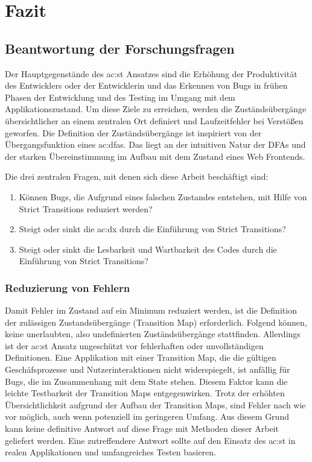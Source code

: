 \chapter{Fazit} \label{ch:fazit}

\section{Beantwortung der Forschungsfragen}

Der Hauptgegenstände des \acrlong{ac:st} Ansatzes sind die Erhöhung der Produktivität des Entwicklers oder der Entwicklerin und das Erkennen von Bugs in frühen Phasen der Entwicklung und des Testing im Umgang mit dem Applikationszustand. Um diese Ziele zu erreichen, werden die Zuständsübergänge übersichtlicher an einem zentralen Ort definiert und Laufzeitfehler bei Verstößen geworfen. Die Definition der Zuständsübergänge ist inspiriert von der Übergangsfunktion eines \acrshort{ac:dfa}s. Das liegt an der intuitiven Natur der DFAs und der starken Übereinstimmung im Aufbau mit dem Zustand eines Web Frontends.

Die drei zentralen Fragen, mit denen sich diese Arbeit beschäftigt sind:

\begin{enumerate}
  \item Können Bugs, die Aufgrund eines falschen Zustandes entstehen, mit Hilfe von Strict Transitions reduziert werden?
  \item Steigt oder sinkt die \acrshort{ac:dx} durch die Einführung von Strict Transitions?
  \item Steigt oder sinkt die Lesbarkeit und Wartbarkeit des Codes durch die Einführung von Strict Transitions?
\end{enumerate}

\subsection{Reduzierung von Fehlern}

Damit Fehler im Zustand auf ein Minimum reduziert werden, ist die Definition der zulässigen Zustandsübergänge (Transition Map) erforderlich. Folgend können, keine unerlaubten, also undefinierten Zuständsübergänge stattfinden. Allerdings ist der \acrshort{ac:st} Ansatz ungeschützt vor fehlerhaften oder unvollständigen Definitionen. Eine Applikation mit einer Transition Map, die die gültigen Geschäfsprozesse und Nutzerinteraktionen nicht widerspiegelt, ist anfällig für Bugs, die im Zusammenhang mit dem State stehen. Diesem Faktor kann die leichte Testbarkeit der Transition Maps entgegenwirken. Trotz der erhöhten Übersichtlichkeit aufgrund der Aufbau der Transition Maps, sind Fehler nach wie vor möglich, auch wenn potenziell im geringeren Umfang. Aus diesem Grund kann keine definitive Antwort auf diese Frage mit Methoden dieser Arbeit geliefert werden. Eine zutreffendere Antwort sollte auf den Einsatz des \acrshort{ac:st} in realen Applikationen und umfangreiches Testen basieren.

